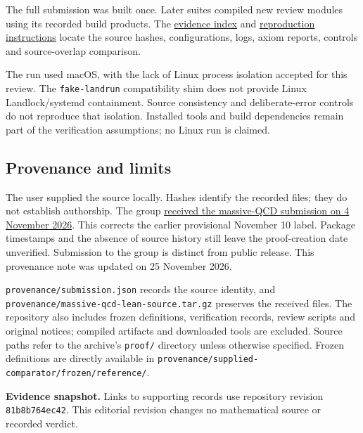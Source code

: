 \documentclass[
  11pt,
]{article}
\begin{document}
The full submission was built once. Later suites compiled new review
modules using its recorded build products. The
\href{https://github.com/yang-mills-group/QCD/blob/main/docs/evidence.md}{evidence
index} and
\href{https://github.com/yang-mills-group/QCD/blob/main/docs/reproduce.md}{reproduction
instructions} locate the source hashes, configurations, logs, axiom
reports, controls and source-overlap comparison.

The run used macOS, with the lack of Linux process isolation accepted
for this review. The {\small \nolinkurl{fake-landrun}} compatibility
shim does not provide Linux Landlock/systemd containment. Source
consistency and deliberate-error controls do not reproduce that
isolation. Installed tools and build dependencies remain part of the
verification assumptions; no Linux run is claimed.

\subsection{Provenance and limits}\label{provenance-and-limits}

The user supplied the source locally. Hashes identify the recorded
files; they do not establish authorship. The group
\href{https://github.com/yang-mills-group/submissions/blob/main/docs/submission-dates.md}{received the massive-QCD submission on 4 November 2026}. This corrects the earlier provisional November 10 label.
Package timestamps and the absence of source history still leave the
proof-creation date unverified. Submission to the group is distinct from
public release. This provenance note was updated on 25 November 2026.

{\small \nolinkurl{provenance/submission.json}} records the source
identity, and
{\small \nolinkurl{provenance/massive-qcd-lean-source.tar.gz}} preserves
the received files. The repository also includes frozen definitions,
verification records, review scripts and original notices; compiled
artifacts and downloaded tools are excluded. Source paths refer to the
archive's {\small \nolinkurl{proof/}} directory unless otherwise
specified. Frozen definitions are directly available in
{\small \nolinkurl{provenance/supplied-comparator/frozen/reference/}}.

\textbf{Evidence snapshot.} Links to supporting records use repository
revision {\small \nolinkurl{81b8b764ec42}}. This editorial revision
changes no mathematical source or recorded verdict.
\end{document}
